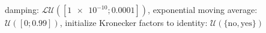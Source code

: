 damping: $\mathcal{LU}([\num[scientific-notation=true]{1e-10}; \num[scientific-notation=true]{0.0001}])$, exponential moving average: $\mathcal{U}([\num[scientific-notation=false]{0}; \num[scientific-notation=true]{0.99}])$, initialize Kronecker factors to identity: $\mathcal{U}(\{\text{no},\text{yes}\})$